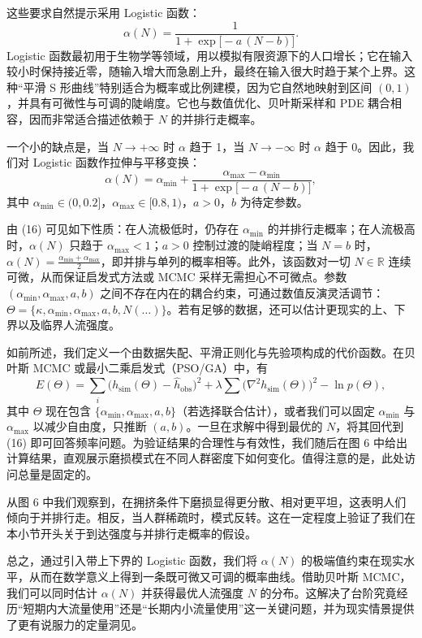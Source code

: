\documentclass[11pt,a4paper,fontset=windows]{ctexart}
\newcommand{\R}{\mathbb{R}}
\begin{document}
这些要求自然提示采用 Logistic 函数：
\[
\alpha(N)=\frac{1}{1+\exp\bigl[-a\,(N-b)\bigr]}.
\]
Logistic 函数最初用于生物学等领域，用以模拟有限资源下的人口增长；它在输入较小时保持接近零，随输入增大而急剧上升，最终在输入很大时趋于某个上界。这种“平滑 S 形曲线”特别适合为概率或比例建模，因为它自然地映射到区间 $(0,1)$，并具有可微性与可调的陡峭度。它也与数值优化、贝叶斯采样和 PDE 耦合相容，因而非常适合描述依赖于 $N$ 的并排行走概率。

一个小的缺点是，当 $N\to+\infty$ 时 $\alpha$ 趋于 1，当 $N\to-\infty$ 时 $\alpha$ 趋于 0。因此，我们对 Logistic 函数作拉伸与平移变换：
\begin{equation}
\alpha(N)=\alpha_{\min}+\frac{\alpha_{\max}-\alpha_{\min}}{1+\exp\bigl[-a\,(N-b)\bigr]},
\end{equation}
其中 $\alpha_{\min}\in(0,0.2]$，$\alpha_{\max}\in[0.8,1)$，$a>0$，$b$ 为待定参数。

由 (16) 可见如下性质：在人流极低时，仍存在 $\alpha_{\min}$ 的并排行走概率；在人流极高时，$\alpha(N)$ 只趋于 $\alpha_{\max}<1$；$a>0$ 控制过渡的陡峭程度；当 $N=b$ 时，$\alpha(N)=\frac{\alpha_{\min}+\alpha_{\max}}{2}$，即并排与单列的概率相等。此外，该函数对一切 $N\in\R$ 连续可微，从而保证启发式方法或 MCMC 采样无需担心不可微点。参数 $(\alpha_{\min},\alpha_{\max},a,b)$ 之间不存在内在的耦合约束，可通过数值反演灵活调节：$\Theta=\{\kappa,\alpha_{\min},\alpha_{\max},a,b,N(\dots)\}$。若有足够的数据，还可以估计更现实的上、下界以及临界人流强度。

如前所述，我们定义一个由数据失配、平滑正则化与先验项构成的代价函数。在贝叶斯 MCMC 或最小二乘启发式（PSO/GA）中，有
\begin{equation}
E(\Theta)=\sum_{i}\bigl(h_{\text{sim}}(\Theta)-\hat{h}_{\text{obs}}\bigr)^2
+\lambda\sum\bigl(\nabla^2h_{\text{sim}}(\Theta)\bigr)^2-\ln p(\Theta),
\end{equation}
其中 $\Theta$ 现在包含 $\{\alpha_{\min},\alpha_{\max},a,b\}$（若选择联合估计），或者我们可以固定 $\alpha_{\min}$ 与 $\alpha_{\max}$ 以减少自由度，只推断 $(a,b)$。一旦在求解中得到最优的 $N$，将其回代到 (16) 即可回答频率问题。为验证结果的合理性与有效性，我们随后在图 6 中给出计算结果，直观展示磨损模式在不同人群密度下如何变化。值得注意的是，此处访问总量是固定的。

从图 6 中我们观察到，在拥挤条件下磨损显得更分散、相对更平坦，这表明人们倾向于并排行走。相反，当人群稀疏时，模式反转。这在一定程度上验证了我们在本小节开头关于到达强度与并排行走概率的假设。

总之，通过引入带上下界的 Logistic 函数，我们将 $\alpha(N)$ 的极端值约束在现实水平，从而在数学意义上得到一条既可微又可调的概率曲线。借助贝叶斯 MCMC，我们可以同时估计 $\alpha(N)$ 并获得最优人流强度 $N$ 的分布。这解决了台阶究竟经历“短期内大流量使用”还是“长期内小流量使用”这一关键问题，并为现实情景提供了更有说服力的定量洞见。
\end{document}
